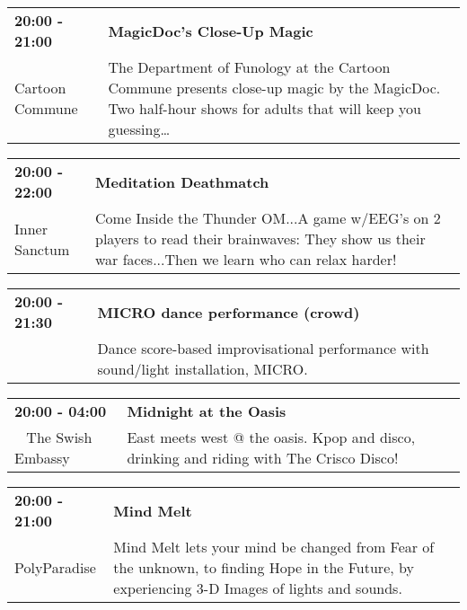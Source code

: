 \begin{tabular}{ p{1in} p{2.2in} }
    \textbf{20:00 - 21:00} & \textbf{MagicDoc's Close-Up Magic } \\
    Cartoon Commune \newline  & The Department of Funology at the Cartoon Commune presents close-up magic by the MagicDoc. Two half-hour shows for adults that will keep you guessing\ldots \\
    \hline 
\end{tabular}
    
\begin{tabular}{ p{1in} p{2.2in} }
    \textbf{20:00 - 22:00} & \textbf{Meditation Deathmatch} \\
    Inner Sanctum \newline  & Come Inside the Thunder OM...A game w/EEG's on 2 players to read their brainwaves: They show us their war faces...Then we learn who can relax harder! \\
    \hline 
\end{tabular}
    
\begin{tabular}{ p{1in} p{2.2in} }
    \textbf{20:00 - 21:30} & \textbf{MICRO dance performance (crowd)} \\
    ~ \newline  & Dance score-based improvisational performance with sound/light installation, MICRO. \\
    \hline 
\end{tabular}
    
\begin{tabular}{ p{1in} p{2.2in} }
    \textbf{20:00 - 04:00} & \textbf{Midnight at the Oasis} \\
    ~ \newline The Swish Embassy & East meets west @ the oasis. Kpop and disco, drinking and riding with The Crisco Disco! \\
    \hline 
\end{tabular}
    
\begin{tabular}{ p{1in} p{2.2in} }
    \textbf{20:00 - 21:00} & \textbf{Mind Melt } \\
    PolyParadise \newline  & Mind Melt lets your mind be changed from Fear of the unknown, to finding Hope in the Future, by experiencing 3-D Images of lights and sounds. \\
    \hline 
\end{tabular}
    
